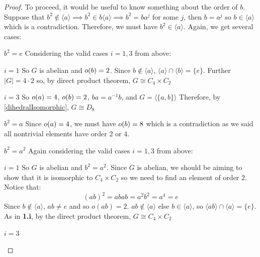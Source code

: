 \documentclass[../main.tex]{subfiles}
\begin{document}
\begin{proof}
  To proceed, it would be useful to know something about the order of $b$.
  Suppose that $b^2 \notin \langle a \rangle \implies b^2 \in b\langle a \rangle \implies b^2 = ba^{j}$ for some $j$, then $b = a^{j}$ so $b \in \langle a \rangle$ which is a contradiction.
  Therefore, we must have $b^2 \in \langle a \rangle$.
  Again, we get several cases:
  \begin{proofcases}
    \begin{case}{$b^2 = e$}
      Considering the valid cases $i = 1, 3$ from above:
      \begin{proofcases}
        \begin{case}{$i = 1$}
          So $G$ is abelian and $o(b) = 2$.
          Since $b \notin \langle a \rangle$, $\langle a \rangle \cap \langle b \rangle = \{e\}$.
          Further $|G| = 4 \cdot 2$ so, by direct product theorem, $G \cong C_4 \times C_2$ \tick
        \end{case}
        \begin{case}{$i = 3$}
          So $o(a) = 4$, $o(b) = 2$, $ba = a^{-1}b$, and $G = \langle \{a, b\} \rangle$
          Therefore, by \cref{dihedralIsomorphic}, $G \cong D_8$ \tick
        \end{case}
      \end{proofcases}
    \end{case}
    \begin{case}{$b^2 = a$}
      Since $o(a) = 4$, we must have $o(b) = 8$ which is a contradiction as we said all nontrivial elements have order 2 or 4.
    \end{case}
    \begin{case}{$b^2 = a^2$}
      Again considering the valid cases $i = 1, 3$ from above:
      \begin{proofcases}
        \begin{case}{$i = 1$}
          So $G$ is abelian and $b^2 = a^2$.
          Since $G$ is abelian, we should be aiming to show that it is isomorphic to $C_4 \times C_2$ so we need to find an element of order 2.
          Notice that:
          \[
            (ab)^2 = abab = a^2b^2 = a^4 = e
          \]
          Since $b \notin \langle a \rangle$, $ab \neq e$ and so $o(ab) = 2$.
          $ab \notin \langle a \rangle$ else $b \in \langle a \rangle$, so $\langle ab \rangle \cap \langle a \rangle = \{e\}$.
          As in \textbf{1.i}, by the direct product theorem, $G \cong C_4 \times C_2$ \tick
        \end{case}
        \begin{case}{$i = 3$}

\end{case}
\end{proofcases}
\end{case}
\end{proofcases}
\end{proof}
\end{document}
